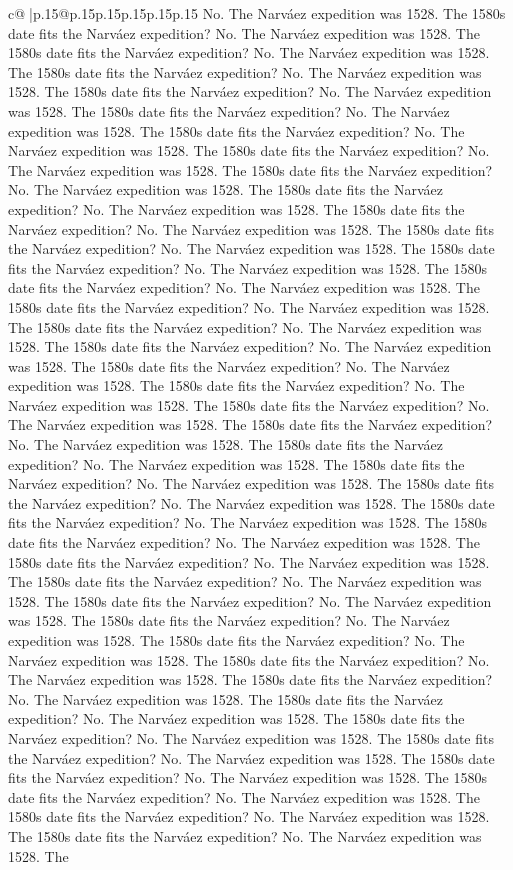 \documentclass{article}
\begin{document}
{\begin{supertabular}{c@{$\;$}|p{.15\linewidth}@{}p{.15\linewidth}p{.15\linewidth}p{.15\linewidth}p{.15\linewidth}p{.15\linewidth}}
{{{No. The Narváez expedition was 1528. The 1580s date fits the Narváez expedition? No. The Narváez expedition was 1528. The 1580s date fits the Narváez expedition? No. The Narváez expedition was 1528. The 1580s date fits the Narváez expedition? No. The Narváez expedition was 1528. The 1580s date fits the Narváez expedition? No. The Narváez expedition was 1528. The 1580s date fits the Narváez expedition? No. The Narváez expedition was 1528. The 1580s date fits the Narváez expedition? No. The Narváez expedition was 1528. The 1580s date fits the Narváez expedition? No. The Narváez expedition was 1528. The 1580s date fits the Narváez expedition? No. The Narváez expedition was 1528. The 1580s date fits the Narváez expedition? No. The Narváez expedition was 1528. The 1580s date fits the Narváez expedition? No. The Narváez expedition was 1528. The 1580s date fits the Narváez expedition? No. The Narváez expedition was 1528. The 1580s date fits the Narváez expedition? No. The Narváez expedition was 1528. The 1580s date fits the Narváez expedition? No. The Narváez expedition was 1528. The 1580s date fits the Narváez expedition? No. The Narváez expedition was 1528. The 1580s date fits the Narváez expedition? No. The Narváez expedition was 1528. The 1580s date fits the Narváez expedition? No. The Narváez expedition was 1528. The 1580s date fits the Narváez expedition? No. The Narváez expedition was 1528. The 1580s date fits the Narváez expedition? No. The Narváez expedition was 1528. The 1580s date fits the Narváez expedition? No. The Narváez expedition was 1528. The 1580s date fits the Narváez expedition? No. The Narváez expedition was 1528. The 1580s date fits the Narváez expedition? No. The Narváez expedition was 1528. The 1580s date fits the Narváez expedition? No. The Narváez expedition was 1528. The 1580s date fits the Narváez expedition? No. The Narváez expedition was 1528. The 1580s date fits the Narváez expedition? No. The Narváez expedition was 1528. The 1580s date fits the Narváez expedition? No. The Narváez expedition was 1528. The 1580s date fits the Narváez expedition? No. The Narváez expedition was 1528. The 1580s date fits the Narváez expedition? No. The Narváez expedition was 1528. The 1580s date fits the Narváez expedition? No. The Narváez expedition was 1528. The 1580s date fits the Narváez expedition? No. The Narváez expedition was 1528. The 1580s date fits the Narváez expedition? No. The Narváez expedition was 1528. The 1580s date fits the Narváez expedition? No. The Narváez expedition was 1528. The 1580s date fits the Narváez expedition? No. The Narváez expedition was 1528. The 1580s date fits the Narváez expedition? No. The Narváez expedition was 1528. The 1580s date fits the Narváez expedition? No. The Narváez expedition was 1528. The 1580s date fits the Narváez expedition? No. The Narváez expedition was 1528. The 1580s date fits the Narváez expedition? No. The Narváez expedition was 1528. The 1580s date fits the Narváez expedition? No. The Narváez expedition was 1528. The 1580s date fits the Narváez expedition? No. The Narváez expedition was 1528. The 1580s date fits the Narváez expedition? No. The Narváez expedition was 1528. The }}}
\end{supertabular}}
\end{document}
